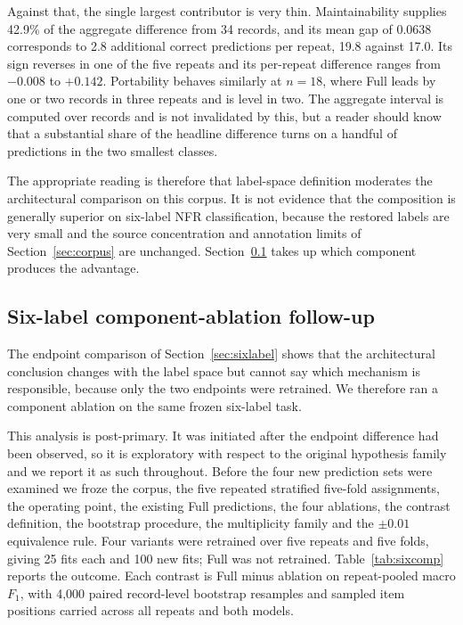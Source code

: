 \documentclass[11pt,a4paper]{article}
\begin{document}
Against that, the single largest contributor is very thin. Maintainability supplies 42.9\% of the
aggregate difference from 34 records, and its mean gap of 0.0638 corresponds to 2.8 additional correct
predictions per repeat, 19.8 against 17.0. Its sign reverses in one of the five repeats and its per-repeat
difference ranges from $-0.008$ to $+0.142$. Portability behaves similarly at $n = 18$, where Full leads by
one or two records in three repeats and is level in two. The aggregate interval is computed over records
and is not invalidated by this, but a reader should know that a substantial share of the headline
difference turns on a handful of predictions in the two smallest classes.

The appropriate reading is therefore that label-space definition moderates the architectural comparison on
this corpus. It is not evidence that the composition is generally superior on six-label NFR classification,
because the restored labels are very small and the source concentration and annotation limits of
Section~\ref{sec:corpus} are unchanged. Section~\ref{sec:sixcomp} takes up which component produces the advantage.

\subsection{Six-label component-ablation follow-up}
\label{sec:sixcomp}

The endpoint comparison of Section~\ref{sec:sixlabel} shows that the architectural conclusion changes with
the label space but cannot say which mechanism is responsible, because only the two endpoints were
retrained. We therefore ran a component ablation on the same frozen six-label task.

This analysis is post-primary. It was initiated after the endpoint difference had been observed, so it is
exploratory with respect to the original hypothesis family and we report it as such throughout. Before the
four new prediction sets were examined we froze the corpus, the five repeated stratified five-fold
assignments, the operating point, the existing Full predictions, the four ablations, the contrast
definition, the bootstrap procedure, the multiplicity family and the $\pm 0.01$ equivalence rule. Four
variants were retrained over five repeats and five folds, giving 25 fits each and 100 new fits; Full was
not retrained. Table~\ref{tab:sixcomp} reports the outcome. Each contrast is Full minus ablation on repeat-pooled macro $F_1$, with 4,000 paired
record-level bootstrap resamples and sampled item positions carried across all repeats and both models.
\end{document}
